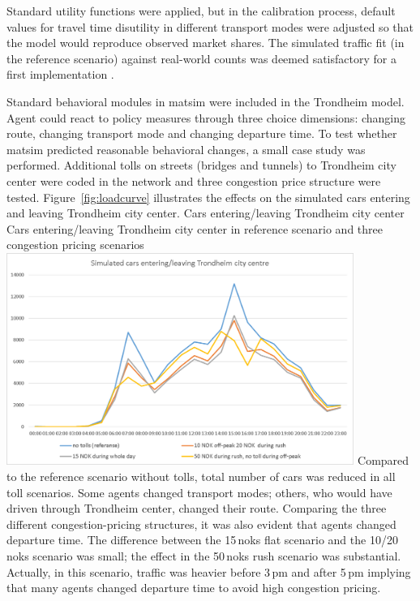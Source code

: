 Standard utility functions were applied, but in the calibration process, default values for travel time disutility in different transport modes were adjusted so that the model would reproduce observed market shares. The simulated traffic fit (in the reference scenario) against real-world counts was deemed satisfactory for a first implementation \citep[][]{Bockemuehl_TechRep_UH_2014}. 

Standard behavioral modules in \gls{matsim} were included in the Trondheim model. Agent could react to policy measures through three choice dimensions: changing route, changing transport mode and changing departure time. To test whether \gls{matsim} predicted reasonable behavioral changes, a small case study was performed. Additional tolls on streets (bridges and tunnels) to Trondheim city center were coded in the network and three congestion price structure were tested. Figure~\ref{fig:loadcurve} illustrates the effects on the simulated cars entering and leaving Trondheim city center. 
%
\createfigure%
{Cars entering/leaving Trondheim city center}%
{Cars entering/leaving Trondheim city center in reference scenario and three congestion pricing scenarios \citep[source][]{Bockemuehl_TechRep_UH_2014}}%
{\label{fig:loadcurve}}%
{\includegraphics[width=0.85\textwidth, angle=0]{./scenarios/figures/trondheimloadcurve.png}}%
{}
%
Compared to the reference scenario without tolls, total number of cars was reduced in all toll scenarios. Some agents changed transport modes; others, who would have driven through Trondheim center, changed their route. Comparing the three different congestion-pricing structures, it was also evident that agents changed departure time. The difference between the 15\,\glspl{nok} flat scenario and the 10/20\,\glspl{nok} scenario was small; the effect in the 50\,\glspl{nok} rush scenario was substantial. Actually, in this scenario, traffic was heavier before 3\,pm and after 5\,pm implying that many agents changed departure time to avoid high congestion pricing.  











